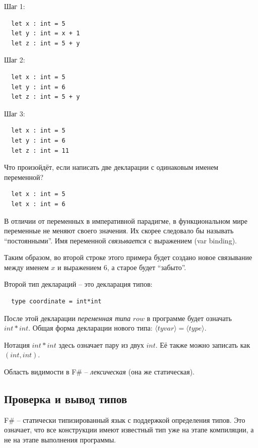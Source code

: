 \documentclass[a4paper,11pt]{article}
\begin{document}
Шаг 1:

\begin{lstlisting}
  let x : int = 5
  let y : int = x + 1
  let z : int = 5 + y
\end{lstlisting}

Шаг 2:

\begin{lstlisting}
  let x : int = 5
  let y : int = 6
  let z : int = 5 + y
\end{lstlisting}

Шаг 3:

\begin{lstlisting}
  let x : int = 5
  let y : int = 6
  let z : int = 11
\end{lstlisting}

Что произойдёт, если написать две декларации с одинаковым именем переменной?

\begin{lstlisting}
  let x : int = 5
  let x : int = 6
\end{lstlisting}

В отличии от переменных в императивной парадигме, в функциональном мире
переменные не меняют своего значения. Их скорее следовало бы называть
``постоянными''. Имя переменной \emph{связывается} с выражением (var binding).

Таким образом, во второй строке этого примера будет создано новое 
связывание между именем $x$ и выражением $6$, а старое будет ``забыто''.

Второй тип деклараций -- это декларация типов:

\begin{lstlisting}
  type coordinate = int*int
\end{lstlisting}

После этой декларации \emph{переменная типа} $row$ в программе будет означать
$int * int$. Общая форма декларации нового типа: $\langle tyvar \rangle =
\langle type \rangle$.

Нотация $int * int$ здесь означает пару из двух $int$. Её также можно записать
как $(int, int)$.

Область видимости в F\# -- \emph{лексическая} (она же статическая). 

\subsection{Проверка и вывод типов}

F\# -- статически типизированный язык с поддержкой определения типов. Это 
означает, что все конструкции имеют известный тип уже на этапе компиляции, а не
на этапе выполнения программы.
\end{document}
